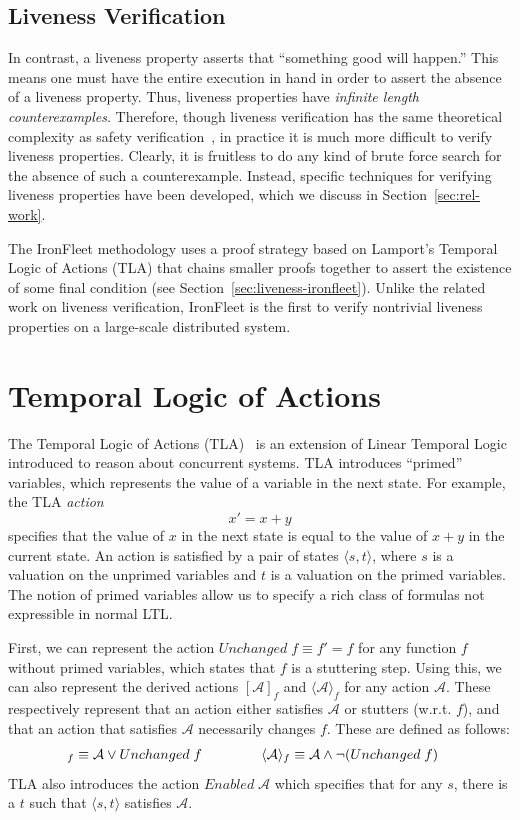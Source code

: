 \documentclass{llncs}
\begin{document}
\subsection{Liveness Verification}\label{sec:liveness-description}
In contrast, a liveness property asserts that ``something good will happen.''
This means one must have the entire execution in hand in order to assert the
absence of a liveness property. Thus, liveness properties have \textit{infinite
  length counterexamples}.  Therefore, though liveness verification has the same
theoretical complexity as safety verification~\cite{simulation-liveness}, in
practice it is much more difficult to verify liveness properties. Clearly, it is
fruitless to do any kind of brute force search for the absence of such a
counterexample. Instead, specific techniques for verifying liveness properties
have been developed, which we discuss in Section~\ref{sec:rel-work}.

The IronFleet methodology uses a proof strategy based on Lamport's Temporal
Logic of Actions (TLA) that chains smaller proofs together to assert the
existence of some final condition (see
Section~\ref{sec:liveness-ironfleet}). Unlike the related work on liveness
verification, IronFleet is the first to verify nontrivial liveness properties on
a large-scale distributed system.
%

\section{Temporal Logic of Actions}\label{sec:tla}
The Temporal Logic of Actions (TLA)~\cite{tla-lamport} is an extension of Linear Temporal
Logic introduced to reason about concurrent systems. TLA introduces ``primed''
variables, which represents the value of a variable in the next state. For
example, the TLA \textit{action} $$x' = x + y$$ specifies that the value of $x$
in the next state is equal to the value of $x + y$ in the current state. An
action is satisfied by a pair of states $\langle s, t \rangle$, where $s$ is a
valuation on the unprimed variables and $t$ is a valuation on the primed
variables. The notion of primed variables allow us to specify a rich class of
formulas not expressible in normal LTL.

First, we can represent the action $Unchanged\;f \equiv f' = f$ for any 
function $f$  without primed variables, which states that $f$ is a
stuttering step. Using this, we can also represent the derived actions
$[\mathcal A]_f$ and $\langle \mathcal A \rangle_f$ for any action
$\mathcal A$. These respectively represent that an action either satisfies $\mathcal A$ or
stutters (w.r.t. $f$), and that an action that satisfies $\mathcal A$
necessarily changes $f$. These are defined as follows:
\begin{align*}
  [\mathcal A]_f \equiv \mathcal A \vee Unchanged\;f \hspace{1.5cm}
  & \langle \mathcal A \rangle_f \equiv \mathcal A \wedge \neg(Unchanged\;f)
\end{align*}
TLA also introduces the action $Enabled\;\mathcal A$ which specifies that for
any $s$, there is a $t$ such that $\langle s, t \rangle$ satisfies $\mathcal A$.
\end{document}
